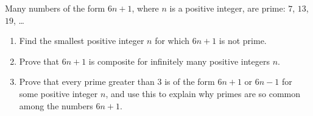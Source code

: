 Many numbers of the form $6n+1$, where $n$ is a positive integer, are prime: $7$, $13$, $19$, \dots
\begin{enumerate}
\item[(a)] Find the smallest positive integer $n$ for which $6n+1$ is not prime.
\item[(b)] Prove that $6n+1$ is composite for infinitely many positive integers $n$.
\item[(c)] Prove that every prime greater than $3$ is of the form $6n+1$ or $6n-1$ for some positive integer $n$, and use this to explain why primes are so common among the numbers $6n+1$.
\end{enumerate}
